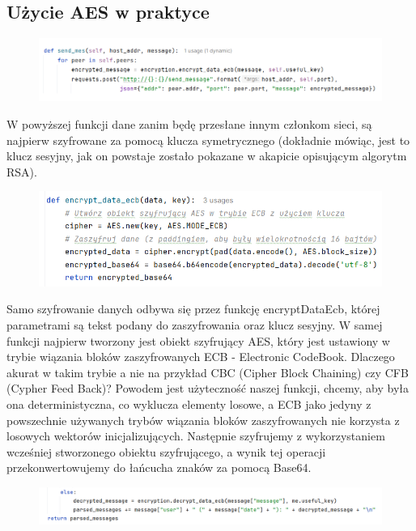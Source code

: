 \subsection{Użycie AES w praktyce}
\label{sec:AESPraktyka}
\begin{figure}[H]
    \centering
    \includegraphics[width=\textwidth]{Images/CodeX20.png}
\end{figure}
W powyższej funkcji dane zanim będę przesłane innym członkom sieci, są najpierw szyfrowane za pomocą klucza symetrycznego (dokładnie mówiąc, jest to klucz sesyjny, jak on powstaje zostało pokazane w akapicie opisującym algorytm RSA).
\begin{figure}[H]
    \centering
    \includegraphics[width=\textwidth]{Images/CodeX21.png}
\end{figure}
Samo szyfrowanie danych odbywa się przez funkcję encryptDataEcb, której parametrami są tekst podany do zaszyfrowania oraz klucz sesyjny. W samej funkcji najpierw tworzony jest obiekt szyfrujący AES, który jest ustawiony w trybie wiązania bloków zaszyfrowanych ECB - Electronic CodeBook. Dlaczego akurat w takim trybie a nie na przykład CBC (Cipher Block Chaining) czy CFB (Cypher Feed Back)? Powodem jest użyteczność naszej funkcji, chcemy, aby była ona deterministyczna, co wyklucza elementy losowe, a ECB jako jedyny z powszechnie używanych trybów wiązania bloków zaszyfrowanych nie korzysta z losowych wektorów inicjalizujących. Następnie szyfrujemy z wykorzystaniem wcześniej stworzonego obiektu szyfrującego, a wynik tej operacji przekonwertowujemy do łańcucha znaków za pomocą Base64.
\begin{figure}[H]
    \centering
    \includegraphics[width=\textwidth]{Images/CodeX22.png}
\end{figure}
